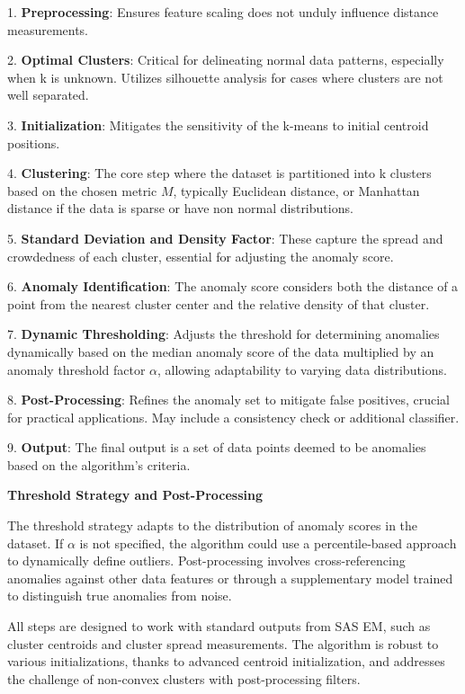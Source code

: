 \documentclass{sigkddExp}
\begin{document}
1. \textbf{Preprocessing}: Ensures feature scaling does not unduly influence distance measurements.

2. \textbf{Optimal Clusters}: Critical for delineating normal data patterns, especially when k is unknown. Utilizes silhouette analysis for cases where clusters are not well separated.

3. \textbf{Initialization}: Mitigates the sensitivity of the k-means to initial centroid positions.

4. \textbf{Clustering}: The core step where the dataset is partitioned into k clusters based on the chosen metric \( M \), typically Euclidean distance, or Manhattan distance if the data is sparse or have non normal distributions.


5. \textbf{Standard Deviation and Density Factor}: These capture the spread and crowdedness of each cluster, essential for adjusting the anomaly score.

6. \textbf{Anomaly Identification}: The anomaly score considers both the distance of a point from the nearest cluster center and the relative density of that cluster.

7. \textbf{Dynamic Thresholding}: Adjusts the threshold for determining anomalies dynamically based on the median anomaly score of the data multiplied by an anomaly threshold factor \( α \), allowing adaptability to varying data distributions.

8. \textbf{Post-Processing}: Refines the anomaly set to mitigate false positives, crucial for practical applications. May include a consistency check or additional classifier.

9.  \textbf{Output}: The final output is a set of data points deemed to be anomalies based on the algorithm's criteria.

\textbf{Threshold Strategy and Post-Processing}

The threshold strategy adapts to the distribution of anomaly scores in the dataset. If \( α \) is not specified, the algorithm could use a percentile-based approach to dynamically define outliers. Post-processing involves cross-referencing anomalies against other data features or through a supplementary model trained to distinguish true anomalies from noise.

All steps are designed to work with standard outputs from SAS EM, such as cluster centroids and cluster spread measurements. The algorithm is robust to various initializations, thanks to advanced centroid initialization, and addresses the challenge of non-convex clusters with post-processing filters.
\end{document}
